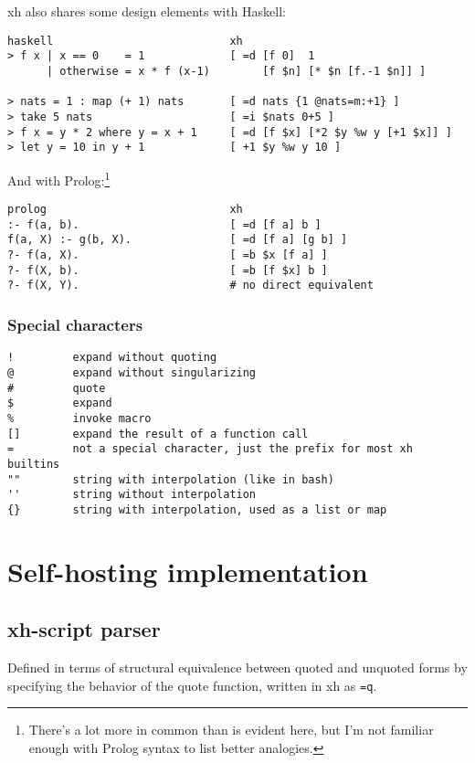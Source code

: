 \documentclass{report}
\begin{document}
    \noindent xh also shares some design elements with Haskell:

\begin{verbatim}
haskell                           xh
> f x | x == 0    = 1             [ =d [f 0]  1
      | otherwise = x * f (x-1)        [f $n] [* $n [f.-1 $n]] ]

> nats = 1 : map (+ 1) nats       [ =d nats {1 @nats=m:+1} ]
> take 5 nats                     [ =i $nats 0+5 ]
> f x = y * 2 where y = x + 1     [ =d [f $x] [*2 $y %w y [+1 $x]] ]
> let y = 10 in y + 1             [ +1 $y %w y 10 ]
\end{verbatim}

    \noindent And with Prolog:\footnote{There's a lot more in common than is
    evident here, but I'm not familiar enough with Prolog syntax to list better
    analogies.}

\begin{verbatim}
prolog                            xh
:- f(a, b).                       [ =d [f a] b ]
f(a, X) :- g(b, X).               [ =d [f a] [g b] ]
?- f(a, X).                       [ =b $x [f a] ]
?- f(X, b).                       [ =b [f $x] b ]
?- f(X, Y).                       # no direct equivalent
\end{verbatim}

\section{Special characters}\label{sec:special-characters}
\begin{verbatim}
!         expand without quoting
@         expand without singularizing
#         quote
$         expand
%         invoke macro
[]        expand the result of a function call
=         not a special character, just the prefix for most xh builtins
""        string with interpolation (like in bash)
''        string without interpolation
{}        string with interpolation, used as a list or map
\end{verbatim}

\part{Self-hosting implementation}\label{part:self-hosting-implementation}
\chapter{xh-script parser}\label{chp:xh-script-parser}
  Defined in terms of structural equivalence between quoted and unquoted forms
  by specifying the behavior of the quote function, written in xh as {\tt =q}.
\end{document}
